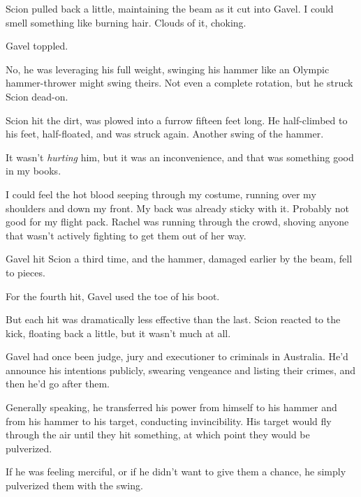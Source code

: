 Scion pulled back a little, maintaining the beam as it cut into Gavel.  I could smell something like burning hair.  Clouds of it, choking.



Gavel toppled.



No, he was leveraging his full weight, swinging his hammer like an Olympic hammer-thrower might swing theirs.  Not even a complete rotation, but he struck Scion dead-on.



Scion hit the dirt, was plowed into a furrow fifteen feet long.  He half-climbed to his feet, half-floated, and was struck again.  Another swing of the hammer.



It wasn't \emph{hurting} him, but it was an inconvenience, and that was something good in my books.



I could feel the hot blood seeping through my costume, running over my shoulders and down my front.  My back was already sticky with it.  Probably not good for my flight pack.  Rachel was running through the crowd, shoving anyone that wasn't actively fighting to get them out of her way.



Gavel hit Scion a third time, and the hammer, damaged earlier by the beam, fell to pieces.



For the fourth hit, Gavel used the toe of his boot.



But each hit was dramatically less effective than the last.  Scion reacted to the kick, floating back a little, but it wasn't much at all.



Gavel had once been judge, jury and executioner to criminals in Australia.  He'd announce his intentions publicly, swearing vengeance and listing their crimes, and then he'd go after them.



Generally speaking, he transferred his power from himself to his hammer and from his hammer to his target, conducting invincibility.  His target would fly through the air until they hit something, at which point they would be pulverized.



If he was feeling merciful, or if he didn't want to give them a chance, he simply pulverized them with the swing.



